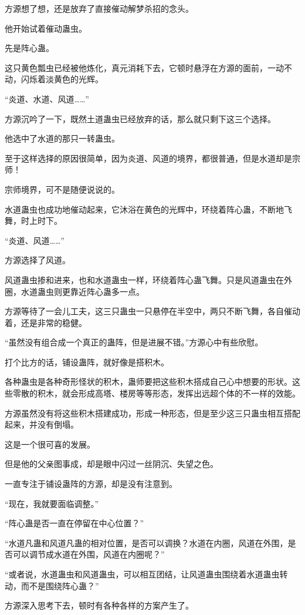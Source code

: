 \begin{this_body}
方源想了想，还是放弃了直接催动解梦杀招的念头。

他开始试着催动蛊虫。

先是阵心蛊。

这只黄色瓢虫已经被他炼化，真元消耗下去，它顿时悬浮在方源的面前，一动不动，闪烁着淡黄色的光辉。

“炎道、水道、风道……”

方源沉吟了一下，既然土道蛊虫已经放弃的话，那么就只剩下这三个选择。

他选中了水道的那只一转蛊虫。

至于这样选择的原因很简单，因为炎道、风道的境界，都很普通，但是水道却是宗师！

宗师境界，可不是随便说说的。

水道蛊虫也成功地催动起来，它沐浴在黄色的光辉中，环绕着阵心蛊，不断地飞舞，时上时下。

“炎道、风道……”

方源选择了风道。

风道蛊虫掺和进来，也和水道蛊虫一样，环绕着阵心蛊飞舞。只是风道蛊虫在外圈，水道蛊虫则更靠近阵心蛊多一点。

方源等待了一会儿工夫，这三只蛊虫一只悬停在半空中，两只不断飞舞，各自催动着，还是非常的稳健。

“虽然没有组合成一个真正的蛊阵，但是进展不错。”方源心中有些欣慰。

打个比方的话，铺设蛊阵，就好像是搭积木。

各种蛊虫是各种奇形怪状的积木，蛊师要把这些积木搭成自己心中想要的形状。这些零散的积木，就会形成高塔、楼房等等形态，发挥出远超个体的不一样的效能。

方源虽然没有将这些积木搭建成功，形成一种形态，但是至少这三只蛊虫相互搭配起来，并没有倒塌。

这是一个很可喜的发展。

但是他的父亲图事成，却是眼中闪过一丝阴沉、失望之色。

一直专注于铺设蛊阵的方源，却是没有注意到。

“现在，我就要面临调整。”

“阵心蛊是否一直在停留在中心位置？”

“水道凡蛊和风道凡蛊的相对位置，是否可以调换？水道在内圈，风道在外围，是否可以调节成水道在外围，风道在内圈呢？”

“或者说，水道蛊虫和风道蛊虫，可以相互团结，让风道蛊虫围绕着水道蛊虫转动，而不是围绕阵心蛊？”

方源深入思考下去，顿时有各种各样的方案产生了。


\end{this_body}
